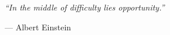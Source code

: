 \pagestyle{fancy}  %

\clearpage  %




\pagestyle{empty}  %

\null\vfill
\textit{“In the middle of difficulty lies opportunity.”}

\begin{flushright}
— Albert Einstein
\end{flushright}

\vfill\vfill\vfill\vfill\vfill\vfill\null
\clearpage  %




